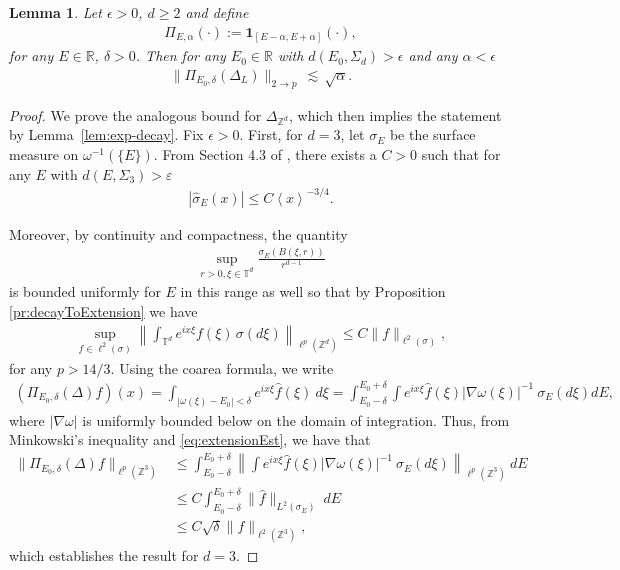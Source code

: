 \documentclass[11pt]{amsart}
\def\Z{{\mathbb{Z}}}
\def\bbT{{\mathbb{T}}}
\def\eps{{\varepsilon}}
\def\One{{\mathbf{1}}}
\def\lsim{{\,\lesssim\,}}
\numberwithin{equation}{section}
\numberwithin{theorem}{section}
\newtheorem{lemma}[theorem]{Lemma}
\begin{document}
\begin{lemma}\label{lm:spectralProj}
Let $\epsilon>0$, $d\ge 2$ and define
\begin{align*}
	\Pi_{E,\alpha}(\cdot) :=\One_{[E-\alpha,E+\alpha]}(\cdot),
\end{align*}
for any $E\in \mathbb{R}$, $\delta>0$. Then for any $E_0\in\mathbb{R}$ with $d(E_0,\Sigma_d)>\epsilon$ and any $\alpha<\epsilon$
\begin{align*}
	\|\Pi_{E_0,\delta}(\Delta_L)\|_{2\to p}\lsim  \sqrt{\alpha}.
\end{align*}
\end{lemma}

\begin{proof}
We prove the analogous bound for $\Delta_{\Z^d}$, which then implies the statement by Lemma~\ref{lem:exp-decay}. Fix $\epsilon>0$. First, for $d=3$, let $\sigma_E$ be the surface measure on $\omega^{-1}(\{E\})$.
From Section 4.3 of \cite{CueninSchippa}, there exists
a $C>0$ such that for any $E$ with $d(E,\Sigma_3)>\eps$
\begin{align*}
|\hat{\sigma}_E(x)|\leq C\left<x \right>^{-3 /4}.
\end{align*}

Moreover, by continuity and compactness, the quantity
\begin{align*}
\sup_{r>0,\xi\in \bbT^{d}}\frac{\sigma_E(B(\xi,r))}{r^{d-1}}
\end{align*}
is bounded uniformly for $E$ in this range as well so that by Proposition \ref{pr:decayToExtension} we have
\begin{align}\label{eq:extensionEst}
\sup_{f\in\ell^2(\sigma)}\left\|\int_{\bbT^{d}}e^{ix\xi}f(\xi)\,\sigma(d\xi)\right\|_{\ell^p(\Z^{d})}\leq C\|f\|_{\ell^2(\sigma)},
\end{align}
for any $p>14/ 3$.  Using the coarea formula, we write
\begin{align*}
(\Pi_{E_0,\delta}(\Delta)f)(x)=
\int_{|\omega(\xi)-E_0|<\delta}e^{ix\xi}\hat{f}(\xi)\:d\xi
=\int_{E_0-\delta}^{E_0+\delta}\int e^{ix\xi}\hat{f}(\xi)|\nabla \omega(\xi)|^{-1} \:\sigma_E(d\xi) dE,
\end{align*}
where $|\nabla\omega|$ is uniformly bounded below on the domain of integration.
Thus, from Minkowski's inequality and \eqref{eq:extensionEst}, we have that
\begin{align*}
\|\Pi_{E_0,\delta}(\Delta)f\|_{\ell^p(\Z^{3})}&\leq
\int_{E_0-\delta}^{E_0+\delta}\left\|\int e^{ix\xi}\hat{f}(\xi)|\nabla \omega(\xi)|^{-1}\:\sigma_E(d\xi)\right\|_{\ell^{p}(\Z^{3})}\:dE\\
&\leq C\int_{E_0-\delta}^{E_0+\delta}\|\hat{f}\|_{L^2(\sigma_E)}\:dE\\
&\leq C\sqrt{\delta} \|f\|_{\ell^2(\Z^{3})},
\end{align*}
which establishes the result for $d=3$.


\end{proof}
\end{document}
